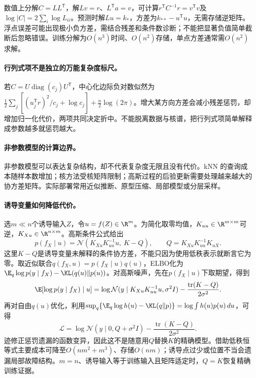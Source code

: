 数值上分解$C=LL^{\mathsf T}$，解$Lv=r$、$L^{\mathsf T}a=v$，可计算$r^{\mathsf T}C^{-1}r=v^{\mathsf T}v$及$\log|C|=2\sum_i\log L_{ii}$。预测时解$Lu=k_*$，方差为$k_{**}-u^{\mathsf T}u$，无需存储逆矩阵。浮点误差可能出现极小负方差，需结合残差和条件数诊断；不能把显著负值简单截断后忽略错误。训练分解为$O(n^3)$时间、$O(n^2)$存储，单点方差通常需$O(n^2)$求解。

\paragraph{行列式项不是独立的万能复杂度标尺。}
若$C=U\operatorname{diag}(c_j)U^{\mathsf T}$，中心化边际负对数似然为$\frac12\sum_j[(u_j^{\mathsf T}r)^2/c_j+\log c_j]+\frac n2\log(2\pi)$。增大某方向方差会减小残差惩罚，却增加归一化代价，两项共同决定折中。不能脱离数据与核谱，把行列式项简单解释成参数越多就惩罚越大。

\paragraph{非参数模型的计算边界。}
非参数模型可以表达复杂结构，却不代表复杂度无限且没有代价。kNN 的查询成本随样本数增加；核方法受核矩阵限制；高斯过程的后验更新需要处理越来越大的协方差矩阵。实际部署常用近似推断、原型压缩、局部模型或分层采样。

\paragraph{诱导变量如何降低代价。}
选$m\ll n$个诱导输入$Z$，令$u=f(Z)\in\R^m$。为简化取零均值，$K_{uu}\in\R^{m\times m}$可逆，$K_{Xu}\in\R^{n\times m}$。高斯条件公式给出
\begin{equation}
 p(f_X\mid u)=\mathcal N(K_{Xu}K_{uu}^{-1}u,\ K-Q),\qquad
 Q=K_{Xu}K_{uu}^{-1}K_{uX}.
\end{equation}
这里$K-Q$是诱导变量未解释的条件协方差，不能只因为使用低秩表示就断言它为零。取近似联合$q(f_X,u)=p(f_X\mid u)q(u)$，ELBO化为$\E_q\log p(y\mid f_X)-\KL(q(u)\|p(u))$。对高斯噪声，先在$p(f_X\mid u)$下取期望，得到
\begin{equation}
 \E[\log p(y\mid f_X)\mid u]
 =\log\mathcal N(y\mid K_{Xu}K_{uu}^{-1}u,\sigma^2I)
 -\frac{\operatorname{tr}(K-Q)}{2\sigma^2}.
\end{equation}
再对自由$q(u)$优化，利用$\sup_q\{\E_q\log h(u)-\KL(q\|p)\}=\log\int h(u)p(u)\,du$，可得
\begin{equation}
 \mathcal L=\log\mathcal N(y\mid0,Q+\sigma^2I)
 -\frac{\operatorname{tr}(K-Q)}{2\sigma^2}.
\end{equation}
迹修正惩罚遗漏的函数变异，因此这不是随意用$Q$替换$K$的精确模型。借助低秩恒等式主要成本可降至$O(nm^2+m^3)$、存储$O(nm)$；诱导点过少或位置不当会遗漏局部故障结构。$m=n$、诱导输入等于训练输入且矩阵适定时，$Q=K$恢复精确训练证据。

